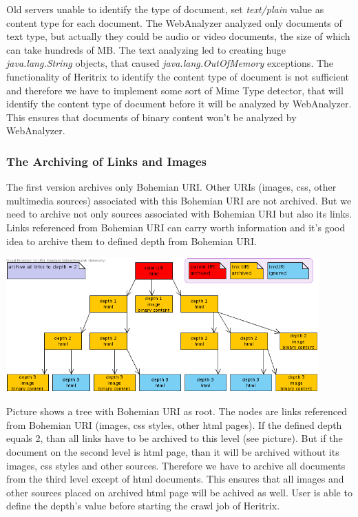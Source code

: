 \documentclass[11pt,a4paper]{article}
\begin{document}
Old servers unable to identify the type of document, set \emph{text/plain} value as content type for each document. The WebAnalyzer analyzed only documents of text type, but actually they could be audio or video documents, the size of which can take hundreds of MB. The text analyzing led to creating huge \emph{java.lang.String} objects, that caused \emph{java.lang.OutOfMemory} exceptions. The functionality of Heritrix to identify the content type of document is not sufficient and therefore we have to implement some sort of Mime Type detector, that will identify the content type of document before it will be analyzed by WebAnalyzer. This ensures that documents of binary content won't be analyzed by WebAnalyzer.

\subsubsection{The Archiving of Links and Images}
\label{aolai}
The first version archives only Bohemian URI. Other URIs (images, css, other multimedia sources) associated with this Bohemian URI are not archived. But we need to archive not only sources associated with Bohemian URI but also its links. Links referenced from Bohemian URI can carry worth information and it's good idea to archive them to defined depth from Bohemian URI.

\begin{center}
\includegraphics[width=120mm]{depth.png}
\end{center}

Picture shows a tree with Bohemian URI as root. The nodes are links referenced from Bohemian URI (images, css styles, other html pages). If the defined depth equals 2, than all links have to be archived to this level (see picture). But if the document on the second level is html page, than it will be archived without its images, css styles and other sources. Therefore we have to archive all documents from the third level except of html documents. This ensures that all images and other sources placed on archived html page will be achived as well. User is able to define the depth's value before starting the crawl job of Heritrix.
\end{document}
